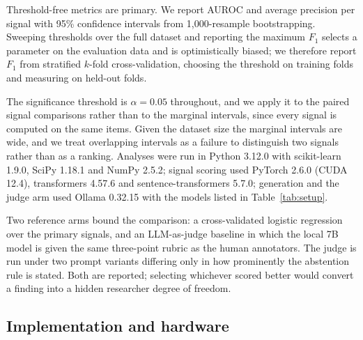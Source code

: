 \documentclass[11pt,a4paper]{article}
\begin{document}
Threshold-free metrics are primary. We report AUROC and average precision per
signal with 95\% confidence intervals from 1{,}000-resample bootstrapping.
Sweeping thresholds over the full dataset and reporting the maximum $F_1$
selects a parameter on the evaluation data and is optimistically biased; we
therefore report $F_1$ from stratified $k$-fold cross-validation, choosing the
threshold on training folds and measuring on held-out folds.

The significance threshold is $\alpha = 0.05$ throughout, and we apply it to the
paired signal comparisons rather than to the marginal intervals, since every
signal is computed on the same items. Given the dataset size the marginal
intervals are wide, and we treat overlapping intervals as a failure to
distinguish two signals rather than as a ranking. Analyses were run in Python
3.12.0 with scikit-learn 1.9.0, SciPy 1.18.1 and NumPy 2.5.2; signal scoring used
PyTorch 2.6.0 (CUDA 12.4), transformers 4.57.6 and sentence-transformers 5.7.0;
generation and the judge arm used Ollama 0.32.15 with the models listed in
Table~\ref{tab:setup}.

Two reference arms bound the comparison: a cross-validated logistic regression
over the primary signals, and an LLM-as-judge baseline in which the local 7B
model is given the same three-point rubric as the human annotators. The judge is
run under two prompt variants differing only in how prominently the abstention
rule is stated. Both are reported; selecting whichever scored better would
convert a finding into a hidden researcher degree of freedom.

\subsection{Implementation and hardware}
\label{sec:setup}
\end{document}
